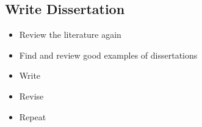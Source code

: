 \subsection{Write Dissertation}

\begin{itemize}
	\item Review the literature again
	\item Find and review good examples of dissertations
	\item Write
	\item Revise
	\item Repeat
\end{itemize}


